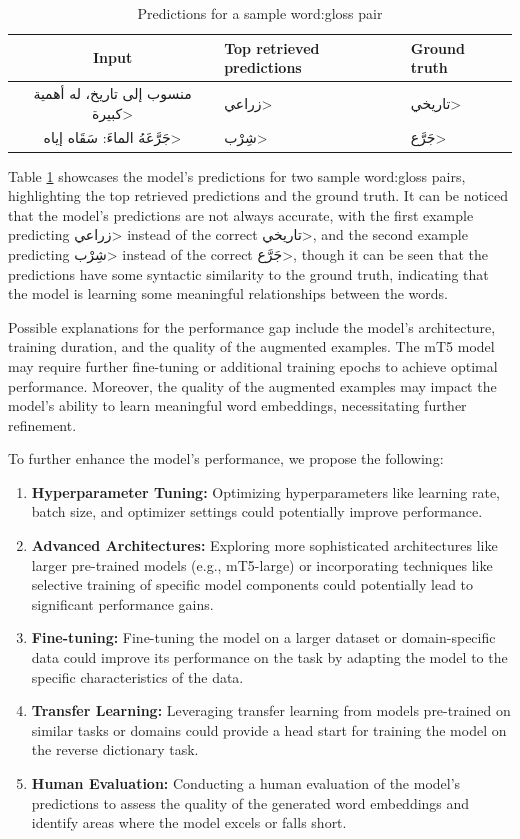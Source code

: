 \documentclass[15pt]{article}
\begin{document}
\begin{table}[H]
    \centering
    \caption{Predictions for a sample word:gloss pair}
    \label{table:results-sample}
    \renewcommand{\arraystretch}{1.5}%
    \begin{tabularx}{\textwidth}{|c|X|X|}
        \hline
        \textbf{Input} & \textbf{Top retrieved predictions} & \textbf{Ground truth} \\
        \hline
        \<منسوب إلى تاريخ، له أهمية كبيرة> & \<زراعي> & \<تاريخي> \\
        \hline
        \<جَرَّعَهُ الماءَ: سَقَاه إياه> & \<شِرْب> & \<جَرَّع> \\
        \hline
    \end{tabularx}
\end{table}

Table \ref{table:results-sample} showcases the model's predictions for two sample word:gloss pairs, highlighting the top retrieved predictions and the ground truth. It can be noticed that the model's predictions are not always accurate, with the first example predicting \<زراعي> instead of the correct \<تاريخي>, and the second example predicting \<شِرْب> instead of the correct \<جَرَّع>, though it can be seen that the predictions have some syntactic similarity to the ground truth, indicating that the model is learning some meaningful relationships between the words.

Possible explanations for the performance gap include the model's architecture, training duration, and the quality of the augmented examples. The mT5 model may require further fine-tuning or additional training epochs to achieve optimal performance. Moreover, the quality of the augmented examples may impact the model's ability to learn meaningful word embeddings, necessitating further refinement.

To further enhance the model's performance, we propose the following:
\begin{enumerate}
    \item \textbf{Hyperparameter Tuning:} Optimizing hyperparameters like learning rate, batch size, and optimizer settings could potentially improve performance.
    \item \textbf{Advanced Architectures:} Exploring more sophisticated architectures like larger pre-trained models (e.g., mT5-large) or incorporating techniques like selective training of specific model components could potentially lead to significant performance gains.
    \item \textbf{Fine-tuning:} Fine-tuning the model on a larger dataset or domain-specific data could improve its performance on the task by adapting the model to the specific characteristics of the data.
    \item \textbf{Transfer Learning:} Leveraging transfer learning from models pre-trained on similar tasks or domains could provide a head start for training the model on the reverse dictionary task.
    \item \textbf{Human Evaluation:} Conducting a human evaluation of the model's predictions to assess the quality of the generated word embeddings and identify areas where the model excels or falls short.
\end{enumerate} 
\end{document}
